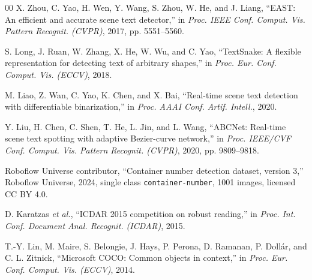 \documentclass[conference]{IEEEtran}
\begin{document}
\begin{thebibliography}{00}
 X. Zhou, C. Yao, H. Wen, Y. Wang, S. Zhou, W. He, and J. Liang, ``EAST: An efficient and accurate scene text detector,'' in \textit{Proc. IEEE Conf. Comput. Vis. Pattern Recognit. (CVPR)}, 2017, pp. 5551--5560.

 S. Long, J. Ruan, W. Zhang, X. He, W. Wu, and C. Yao, ``TextSnake: A flexible representation for detecting text of arbitrary shapes,'' in \textit{Proc. Eur. Conf. Comput. Vis. (ECCV)}, 2018.

 M. Liao, Z. Wan, C. Yao, K. Chen, and X. Bai, ``Real-time scene text detection with differentiable binarization,'' in \textit{Proc. AAAI Conf. Artif. Intell.}, 2020.

 Y. Liu, H. Chen, C. Shen, T. He, L. Jin, and L. Wang, ``ABCNet: Real-time scene text spotting with adaptive Bezier-curve network,'' in \textit{Proc. IEEE/CVF Conf. Comput. Vis. Pattern Recognit. (CVPR)}, 2020, pp. 9809--9818.

 Roboflow Universe contributor, ``Container number detection dataset, version 3,'' Roboflow Universe, 2024, single class \texttt{container-number}, 1001 images, licensed CC BY 4.0.

 D. Karatzas \textit{et al.}, ``ICDAR 2015 competition on robust reading,'' in \textit{Proc. Int. Conf. Document Anal. Recognit. (ICDAR)}, 2015.

 T.-Y. Lin, M. Maire, S. Belongie, J. Hays, P. Perona, D. Ramanan, P. Doll\'ar, and C. L. Zitnick, ``Microsoft COCO: Common objects in context,'' in \textit{Proc. Eur. Conf. Comput. Vis. (ECCV)}, 2014.

\end{thebibliography}
\end{document}
